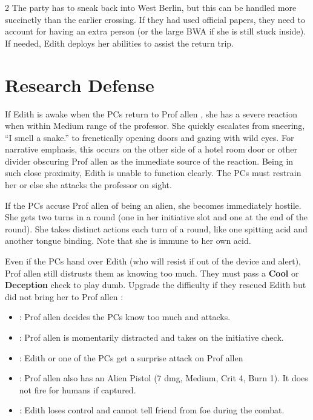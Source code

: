\documentclass{book}
\newcommand{\df}{\DifficultyDie }
\newcommand{\stb}{\SetbackDie }
\newcommand{\ch}{\ChallengeDie }
\newcommand{\prof}{
    {\color{brown} Prof allen}
}
\begin{document}
\begin{multicols*}{2}
The party has to sneak back into West Berlin, but this can be handled more succinctly than the earlier crossing.  If they had used official papers, they need to account for having an extra person (or the large BWA if she is still stuck inside).  If needed, Edith deploys her abilities to assist the return trip.

\section{Research Defense}

If Edith is awake when the PCs return to \prof, she has a severe reaction when within Medium range of the professor.  She quickly escalates from sneering, ``I smell a snake.'' to frenetically opening doors and gazing with wild eyes.  For narrative emphasis, this occurs on the other side of a hotel room door or other divider obscuring \prof as the immediate source of the reaction.  Being in such close proximity, Edith is unable to function clearly.  The PCs must restrain her or else she attacks the professor on sight.

If the PCs accuse \prof of being an alien, she becomes immediately hostile.  She gets two turns in a round (one in her initiative slot and one at the end of the round).  She takes distinct actions each turn of a round, like one spitting acid and another tongue binding.  Note that she is immune to her own acid.

Even if the PCs hand over Edith (who will resist if out of the device and alert), \prof still distrusts them as knowing too much.  They must pass a \ch\df\df\stb \textbf{Cool} or \textbf{Deception} check to play dumb.  Upgrade the difficulty if they rescued Edith but did not bring her to \prof:
    \begin{itemize}
    \setlength\itemsep{-.5em}
        \item \Failure: \prof decides the PCs know too much and attacks.
        \item \Advantage\Advantage: \prof is momentarily distracted and takes \stb on the initiative check.
        \item \Triumph: Edith or one of the PCs get a surprise attack on \prof
        \item \Threat\Threat: \prof also has an Alien Pistol (7 dmg, Medium, Crit 4, Burn 1).  It does not fire for humans if captured.
        \item \Despair:  Edith loses control and cannot tell friend from foe during the combat.
    \end{itemize}


\end{multicols*}
\end{document}
